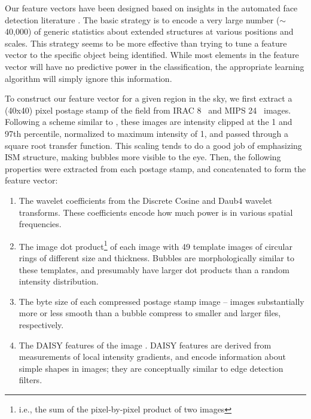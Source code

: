 Our feature vectors have been designed based on insights in the automated face detection literature \citep{ViolaJones}.  The basic strategy is to encode a very large number ($\sim$40,000) of generic statistics about extended structures at various positions and scales. This strategy seems to be more effective than trying to tune a feature vector to the specific object being identified. While most elements in the feature vector will have no predictive power in the classification, the appropriate learning algorithm will simply ignore this information.

To construct our feature vector for a given region in the sky, we first extract a (40x40) pixel postage stamp of the field from IRAC 8 \um\, and MIPS 24 \um\, images. Following a scheme similar to \cite{Simpson12}, these images are intensity clipped at the 1 and 97th percentile, normalized to maximum intensity of 1, and passed through a square root transfer function. This scaling tends to do a good job of emphasizing ISM structure, making bubbles more visible to the eye. Then, the following properties were extracted from each postage stamp, and concatenated to form the feature vector:

\begin{enumerate}
\item The wavelet coefficients from the Discrete Cosine and Daub4 wavelet transforms. These coefficients encode how much power is in various spatial frequencies.
\item The image dot product\footnote{i.e., the sum of the pixel-by-pixel product of two images} of each image with 49 template images of circular rings of different size and thickness. Bubbles are morphologically similar to these templates, and presumably have larger dot products than a random intensity distribution.
\item The byte size of each compressed postage stamp image -- images substantially more or less smooth than a bubble compress to smaller and larger files, respectively.
\item The DAISY features of the image \citep{DAISY}. DAISY features are derived from measurements of local intensity gradients, and encode information about simple shapes in images; they are conceptually similar to edge detection filters.
\end{enumerate}

